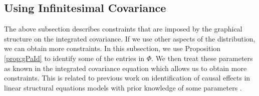 \documentclass[accepted]{uai2021} %
\begin{document}
\subsection{Using Infinitesimal Covariance}
\label{ssec:eqInfCov}

The above subsection describes constraints that are imposed by the graphical 
structure on the integrated 
covariance. If we use other aspects of 
the distribution, 
we can obtain more constraints. In this subsection, we use Proposition 
\ref{prop:gPaId} to identify some of the entries in $\Phi$. We then treat these 
parameters as known in the integrated covariance equation which allows us to 
obtain more constraints. This is related to previous work on identification of 
causal effects in linear structural equations models with prior knowledge of 
some parameters \citep{chenIJCAI2016,chenICML2017}.
\end{document}
